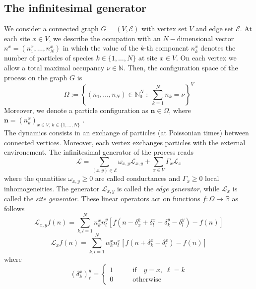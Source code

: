 \documentclass[11pt]{article}
\numberwithin{equation}{section}
\numberwithin{equation}{subsection}
\newcommand{\twoj}{\nu}
\begin{document}
\subsection{The infinitesimal generator}
We consider a connected graph $G=(V,\mathcal{E})$ with vertex set $V$ and edge set $\mathcal{E}$.
At each site $x\in V$, we describe the occupation with an $N-$dimensional vector $n^{x}=(n_{1}^{x},\ldots,n_{N}^{x})$ in which the value of the $k$-th component $n_{k}^{x}$ denotes the number of particles of species $k\in \{1,\ldots,N\}$ at site $x\in V$. On each vertex we allow a total  maximal occupancy $\nu\in \mathbb{N}$. Then, the configuration space of the process on the graph $G$ is 
\begin{equation}\label{stateSpace}
    \Omega:=\left\{(n_{1},\ldots,n_{N})\in\mathbb{N}_0^{N}\;:\; \sum_{k=1}^{N}n_{k}=\twoj\right\}^{V}
\end{equation}
Moreover, we denote a particle configuration as $\mathbf{n}\in \Omega$, where $\mathbf{n}=(n_{k}^{x})_{x\in V,\,k\in\{1,\ldots,N\}}$ .\\
The dynamics consists in an exchange of particles (at Poissonian times) between connected vertices. Moreover, each vertex  exchanges particles with the external environement. The infinitesimal generator of the process reads
\begin{equation}\label{Generator}
    \mathcal{L}=\sum_{(x,y)\in \mathcal{E}}\omega_{x,y}\mathcal{L}_{x,y}+\sum_{x\in V}\Gamma_{x}\mathcal{L}_{x}
\end{equation}
where the quantities $ \omega_{x,y}\geq 0$ are called conductances and $\Gamma_{x}\geq 0$ local inhomogeneities. The generator $\mathcal{L}_{x,y}$ is called the \textit{edge generator}, while $\mathcal{L}_{x}$ is called the \textit{site generator}. These linear operators act on functions $f:\Omega\to \mathbb{R}$ as follows
\begin{equation}\label{edgeGenerator}
\mathcal{L}_{x,y}f(n)=\sum_{k,l=1}^{N}n_{k}^{x}n_{l}^{y}\left[f(n-\delta_{x}^{k}+\delta_{l}^{x}+\delta_{k}^{y}-\delta_{l}^{y})-f(n)\right]
\end{equation}
\begin{equation}\label{siteGenerator}
    \mathcal{L}_{x}f(n)=\sum_{k,l=1}^{N}\alpha_{k}^{x}n_{l}^{x}\left[f(n+\delta_{k}^{x}-\delta_{l}^{x})-f(n)\right]
\end{equation}
where 
\begin{equation}
(\delta_{k}^{x})^{y}_{\ell}=\begin{cases}
1\qquad &\text{if}\quad y=x,\;\ell=k\\
0\qquad &\text{otherwise}
\end{cases}
\end{equation}
\end{document}
